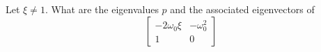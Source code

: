 \bexo
Let $\xi\neq 1$. What are the eigenvalues $p$ and the associated eigenvectors of 
\begin{equation}
\begin{bmatrix}
-2\omega_0\xi  & -\omega_0^2\\
 1 & 0
\end{bmatrix}
\end{equation}
\eexo
{}





